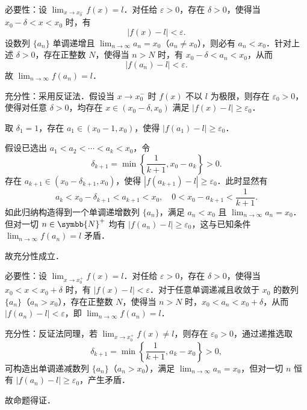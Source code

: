 \begin{myproof}

    必要性：设 $\lim_{x\to x_0^-} f(x) = l$．对任给 $\varepsilon > 0$，存在 $\delta > 0$，使得当 $x_0 - \delta < x < x_0$ 时，有
    \begin{equation}
        |f(x) - l| < \varepsilon.
    \end{equation}
    设数列 $\{a_n\}$ 单调递增且 $\lim_{n\to\infty} a_n = x_0$（$a_n \neq x_0$），则必有 $a_n < x_0$．针对上述 $\delta > 0$，存在正整数 $N$，使得当 $n > N$ 时，有 $x_0 - \delta < a_n < x_0$，从而
    \begin{equation}
        |f(a_n) - l| < \varepsilon.
    \end{equation}
    故 $\lim_{n\to\infty} f(a_n) = l$．

    充分性：采用反证法．假设当 $x \to x_0^-$ 时 $f(x)$ 不以 $l$ 为极限，则存在 $\varepsilon_0 > 0$，使得对任意 $\delta > 0$，均存在 $x \in (x_0 - \delta, x_0)$ 满足 $|f(x) - l| \geqslant \varepsilon_0$．

    取 $\delta_1 = 1$，存在 $a_1 \in (x_0 - 1, x_0)$，使得 $|f(a_1) - l| \geqslant \varepsilon_0$．

    假设已选出 $a_1 < a_2 < \cdots < a_k < x_0$，令
    \begin{equation}
        \delta_{k+1} = \min\left\{ \frac{1}{k+1}, x_0 - a_k \right\} > 0.
    \end{equation}
    存在 $a_{k+1} \in (x_0 - \delta_{k+1}, x_0)$，使得 $|f(a_{k+1}) - l| \geqslant \varepsilon_0$．此时显然有
    \begin{equation}
        a_k < x_0 - \delta_{k+1} < a_{k+1} < x_0, \quad 0 < x_0 - a_{k+1} < \frac{1}{k+1}.
    \end{equation}
    如此归纳构造得到一个单调递增数列 $\{a_n\}$，满足 $a_n < x_0$ 且 $\lim_{n\to\infty} a_n = x_0$．但对一切 $n \in \symbb{N}^+$ 均有 $|f(a_n) - l| \geqslant \varepsilon_0$，这与已知条件 $\lim_{n\to\infty} f(a_n) = l$ 矛盾．

    故充分性成立．


    必要性：设 $\lim_{x\to x_0^+} f(x) = l$．对任给 $\varepsilon > 0$，存在 $\delta > 0$，使得当 $x_0 < x < x_0 + \delta$ 时，有 $|f(x) - l| < \varepsilon$．对于任意单调递减且收敛于 $x_0$ 的数列 $\{a_n\}$（$a_n > x_0$），存在正整数 $N$，使得当 $n > N$ 时，$x_0 < a_n < x_0 + \delta$，从而 $|f(a_n) - l| < \varepsilon$，即 $\lim_{n\to\infty} f(a_n) = l$．

    充分性：反证法同理，若 $\lim_{x\to x_0^+} f(x) \neq l$，则存在 $\varepsilon_0 > 0$，通过递推选取
    \begin{equation}
        \delta_{k+1} = \min\left\{ \frac{1}{k+1}, a_k - x_0 \right\} > 0,
    \end{equation}
    可构造出单调递减数列 $\{a_n\}$（$a_n > x_0$），满足 $\lim_{n\to\infty} a_n = x_0$，但对一切 $n$ 恒有 $|f(a_n) - l| \geqslant \varepsilon_0$，产生矛盾．

    故命题得证．
\end{myproof}

